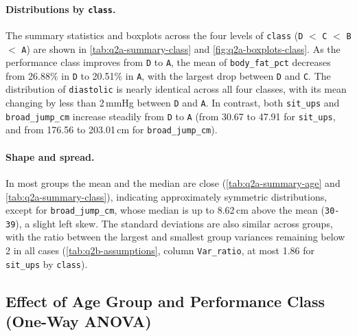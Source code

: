\paragraph{Distributions by \texttt{class}.}
The summary statistics and boxplots across the four levels of \texttt{class} (\texttt{D} $<$ \texttt{C} $<$ \texttt{B} $<$ \texttt{A}) are shown in \autoref{tab:q2a-summary-class} and \autoref{fig:q2a-boxplots-class}.
As the performance class improves from \texttt{D} to \texttt{A}, the mean of \texttt{body\_fat\_pct} decreases from 26.88\% in \texttt{D} to 20.51\% in \texttt{A}, with the largest drop between \texttt{D} and \texttt{C}.
The distribution of \texttt{diastolic} is nearly identical across all four classes, with its mean changing by less than 2\,mmHg between \texttt{D} and \texttt{A}.
In contrast, both \texttt{sit\_ups} and \texttt{broad\_jump\_cm} increase steadily from \texttt{D} to \texttt{A} (from 30.67 to 47.91 for \texttt{sit\_ups}, and from 176.56 to 203.01\,cm for \texttt{broad\_jump\_cm}).

\paragraph{Shape and spread.}
In most groups the mean and the median are close (\autoref{tab:q2a-summary-age} and \autoref{tab:q2a-summary-class}), indicating approximately symmetric distributions, except for \texttt{broad\_jump\_cm}, whose median is up to 8.62\,cm above the mean (\texttt{30-39}), a slight left skew.
The standard deviations are also similar across groups, with the ratio between the largest and smallest group variances remaining below 2 in all cases (\autoref{tab:q2b-assumptions}, column \texttt{Var\_ratio}, at most 1.86 for \texttt{sit\_ups} by \texttt{class}).

\subsection{Effect of Age Group and Performance Class (One-Way ANOVA)}\label{sec:q2b}


